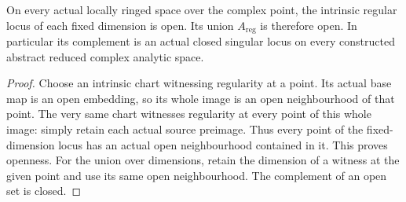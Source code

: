 \begin{theorem}
\label{hir:intrinsic-complex-analytic-regular-locus-open}
\leanok
On every actual locally ringed space over the complex point, the intrinsic
regular locus of each fixed dimension is open. Its union
$A_{\mathrm{reg}}$ is therefore open. In particular its complement is
an actual closed singular locus on every constructed abstract reduced
complex analytic space.
\end{theorem}
\begin{proof}
Choose an intrinsic chart witnessing regularity at a point. Its actual
base map is an open embedding, so its whole image is an open neighbourhood
of that point. The very same chart witnesses regularity at every point
of this whole image: simply retain each actual source preimage. Thus every
point of the fixed-dimension locus has an actual open neighbourhood
contained in it. This proves openness. For the union over dimensions,
retain the dimension of a witness at the given point and use its same
open neighbourhood. The complement of an open set is closed.
\end{proof}

